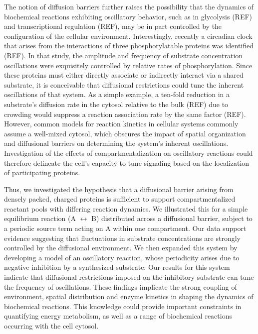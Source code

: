 The notion of diffusion barriers further raises the possibility that the dynamics of biochemical reactions exhibiting oscillatory behavior, such as in glycolysis (REF) and transcriptional regulation (REF), may be in part controlled by the configuration of the cellular environment. 
Interestingly, recently a circadian clock that arises from the interactions of three phosphorylatable proteins was identified (REF). 
In that study, the amplitude and frequency of substrate concentration oscillations were exquisitely controlled by relative rates of phosphorylation. 
Since these proteins must either directly associate or indirectly interact via a shared substrate, 
it is conceivable that  diffusional restrictions could tune the inherent oscillations of that system. 
As a simple example, a ten-fold reduction in a substrate's diffusion rate in the cytosol relative to the bulk (REF) due to crowding would  suppress a reaction association rate by the same factor (REF). %
However, common models for reaction kinetics in cellular systems commonly assume a well-mixed cytosol, which obscures the impact of spatial organization and diffusional barriers on determining the system's inherent oscillations. 
Investigation of the effects of compartmentalization on oscillatory reactions could therefore delineate the cell's capacity to tune signaling based on the localization of participating proteins.  


Thus, we investigated the hypothesis that a diffusional barrier arising from densely packed, charged
proteins is sufficient to support compartmentalized reactant pools with differing reaction dynamics.
We illustrated this for a simple equilibrium reaction (A $\leftrightarrow$ B) distributed across a
diffusional barrier, subject to a periodic source term acting on A within one compartment.
Our data support evidence suggesting that fluctuations in substrate concentrations are strongly controlled by the diffusional environment.
We then expanded this system by developing a model of an oscillatory reaction, whose periodicity arises due
to negative inhibition by a synthesized substrate.
Our results for this system indicate that diffusional restrictions imposed on the  inhibitory substrate can tune the frequency of oscillations. 
These findings implicate the strong coupling of environment, spatial distribution and enzyme kinetics in shaping the dynamics of biochemical reactions. 
This knowledge could provide important constraints in quantifying energy metabolism, as well as a range of biochemical reactions occurring with the cell cytosol. 


